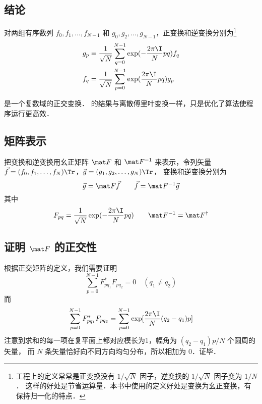 
\subsection{结论}

对两组有序数列 $f_0,f_1,\dots,f_{N-1}$ 和 $g_0,g_2,\dots, g_{N-1}$，正变换和逆变换分别为\footnote{工程上的定义常常是正变换没有 $1/\sqrt{N}$ 因子，逆变换的 $1/\sqrt{N}$ 因子变为 $1/N$． 这样的好处是节省运算量．本书中使用的定义好处是变换为幺正变换，有保持归一化的特点．}
\begin{align}
g_p &= \frac{1}{\sqrt{N}}\sum_{q=0}^{N-1} \exp(-\frac{2\pi\I}{N} p q ) f_q \\
f_q &= \frac{1}{\sqrt{N}}\sum_{p=0}^{N-1} \exp(\frac{2\pi\I}{N} p q) g_p
\end{align}

是一个复数域的正交变换．%
的结果与离散傅里叶变换一样，只是优化了算法使程序运行更高效．

\subsection{矩阵表示}
把变换和逆变换用幺正矩阵 $\mat F$ 和 $\mat F^{-1}$ 来表示，令列矢量 $\vec f = (f_0,f_1,\dots,f_N)\Tr$，$\vec g = (g_1,g_2,\dots,g_N)\Tr$， 变换和逆变换分别为
\begin{equation}
\vec g = \mat F \vec f \qquad
\vec f = \mat F^{-1} \vec g
\end{equation}
其中
\begin{equation}
F_{pq} = \frac{1}{\sqrt{N}} \exp(-\frac{2\pi\I}{N} p q) \qquad
\mat F^{-1} = \mat F^\dag
\end{equation}

\subsection{证明 $\mat F$ 的正交性}
根据正交矩阵的定义，我们需要证明
\begin{equation}
\sum_{p=0}^{N-1} F^*_{pq_1} F_{pq_2} = 0 \quad (q_1 \ne q_2)
\end{equation}
而
\begin{equation}\label{DFT_eq1}
\sum_{p=0}^{N-1} F^*_{pq_1}F_{pq_2}
= \sum_{p=0}^{N-1} \exp[\frac{2\pi\I}{N} (q_2-q_1) p]
\end{equation}
注意到求和的每一项在复平面上都对应模长为1，幅角为 $(q_2-q_1)p/N$ 个圆周的矢量，%
而 $N$ 条矢量恰好向不同方向均匀分布，所以相加为 $0$．证毕．

